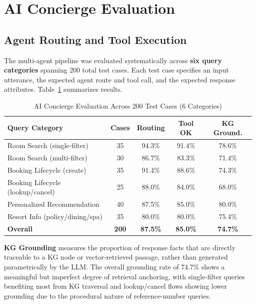 \documentclass[11pt,a4paper]{report}
\begin{document}
\section{AI Concierge Evaluation}

\subsection{Agent Routing and Tool Execution}

The multi-agent pipeline was evaluated systematically across \textbf{six query categories} spanning 200 total test cases. Each test case specifies an input utterance, the expected agent route and tool call, and the expected response attributes. Table~\ref{tab:agent_eval} summarizes results.

\begin{table}[H]
\centering
\caption{AI Concierge Evaluation Across 200 Test Cases (6 Categories)}
\label{tab:agent_eval}
\renewcommand{\arraystretch}{1.4}
\begin{tabular}{p{5.0cm} c c c c}
\toprule
\textbf{Query Category} & \textbf{Cases} & \textbf{Routing} & \textbf{Tool OK} & \textbf{KG Ground.} \\
\midrule
\rowcolor{rowgray}
Room Search (single-filter) & 35 & 94.3\% & 91.4\% & 78.6\% \\
Room Search (multi-filter) & 30 & 86.7\% & 83.3\% & 71.4\% \\
\rowcolor{rowgray}
Booking Lifecycle (create) & 35 & 91.4\% & 88.6\% & 74.3\% \\
Booking Lifecycle (lookup/cancel) & 25 & 88.0\% & 84.0\% & 68.0\% \\
\rowcolor{rowgray}
Personalized Recommendation & 40 & 87.5\% & 85.0\% & 80.0\% \\
Resort Info (policy/dining/spa) & 35 & 80.0\% & 80.0\% & 75.4\% \\
\midrule
\rowcolor{rowgray}
\textbf{Overall} & \textbf{200} & \textbf{87.5\%} & \textbf{85.0\%} & \textbf{74.7\%} \\
\bottomrule
\end{tabular}
\end{table}

\textbf{KG Grounding} measures the proportion of response facts that are directly traceable to a KG node or vector-retrieved passage, rather than generated parametrically by the LLM. The overall grounding rate of 74.7\% shows a meaningful but imperfect degree of retrieval anchoring, with single-filter queries benefiting most from KG traversal and lookup/cancel flows showing lower grounding due to the procedural nature of reference-number queries.
\end{document}
